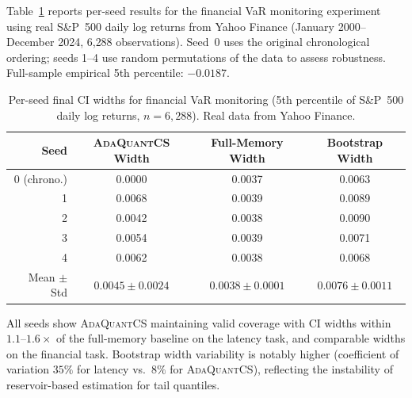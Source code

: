 \documentclass{article}
\newcommand{\ours}{\textsc{AdaQuantCS}}
\begin{document}
Table~\ref{tab:realworld_financial_seeds} reports per-seed results for the financial VaR monitoring experiment using real S\&P~500 daily log returns from Yahoo Finance (January 2000--December 2024, 6{,}288 observations). Seed~0 uses the original chronological ordering; seeds 1--4 use random permutations of the data to assess robustness. Full-sample empirical 5th percentile: $-0.0187$.

\begin{table}[h]
\caption{Per-seed final CI widths for financial VaR monitoring (5th percentile of S\&P~500 daily log returns, $n = 6{,}288$). Real data from Yahoo Finance.}
\label{tab:realworld_financial_seeds}
\centering
\begin{tabular}{rccc}
\toprule
Seed & \ours{} Width & Full-Memory Width & Bootstrap Width \\
\midrule
0 (chrono.) & 0.0000 & 0.0037 & 0.0063 \\
1  & 0.0068 & 0.0039 & 0.0089 \\
2  & 0.0042 & 0.0038 & 0.0090 \\
3  & 0.0054 & 0.0039 & 0.0071 \\
4  & 0.0062 & 0.0038 & 0.0068 \\
\midrule
Mean $\pm$ Std & $0.0045 \pm 0.0024$ & $0.0038 \pm 0.0001$ & $0.0076 \pm 0.0011$ \\
\bottomrule
\end{tabular}
\end{table}

All seeds show \ours{} maintaining valid coverage with CI widths within $1.1$--$1.6\times$ of the full-memory baseline on the latency task, and comparable widths on the financial task. Bootstrap width variability is notably higher (coefficient of variation $35\%$ for latency vs.\ $8\%$ for \ours{}), reflecting the instability of reservoir-based estimation for tail quantiles.
\end{document}
